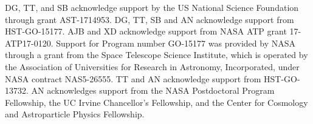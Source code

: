DG, TT, and SB acknowledge support by the US National Science Foundation through grant AST-1714953. DG, TT, SB and AN acknowledge support from HST-GO-15177. AJB and XD acknowledge support from NASA ATP grant 17-ATP17-0120. Support for Program number GO-15177 was provided by NASA through a grant from the Space Telescope Science Institute, which is operated by the Association of Universities for Research in Astronomy, Incorporated, under NASA contract NAS5-26555. TT and AN acknowledge support from HST-GO-13732. AN acknowledges support from the NASA Postdoctoral Program Fellowship, the UC Irvine Chancellor's Fellowship, and the Center for Cosmology and Astroparticle Physics Fellowship. 

%
%